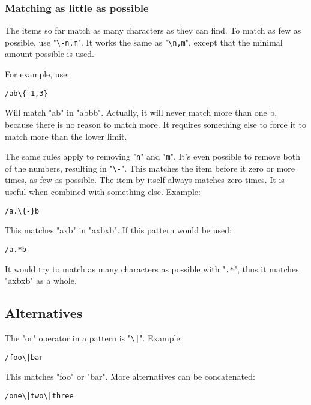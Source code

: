 \subsubsection{Matching as little as possible}
The items so far match as many characters as they can find.
To match as few as possible, use "\texttt{\textbackslash{}{-n,m}}".
It works the same as "\texttt{\textbackslash{}{n,m}}", except that the minimal amount possible is used.

For example, use:

\begin{Verbatim}[samepage=true]
 /ab\{-1,3}
\end{Verbatim}

Will match "ab" in "abbb".
Actually, it will never match more than one b, because there is no reason to match more.
It requires something else to force it to match more than the lower limit.

The same rules apply to removing "\texttt{n}" and "\texttt{m}".
It's even possible to remove both of the numbers, resulting in "\texttt{\textbackslash{}{-}}".
This matches the item before it zero or more times, as few as possible.
The item by itself always matches zero times.
It is useful when combined with something else.
Example:

\begin{Verbatim}[samepage=true]
 /a.\{-}b
\end{Verbatim}

This matches "axb" in "axbxb".
If this pattern would be used:

\begin{Verbatim}[samepage=true]
 /a.*b
\end{Verbatim}

It would try to match as many characters as possible with "\texttt{.*}", thus it matches "axbxb" as a whole.
\subsection{Alternatives}
The "or" operator in a pattern is "\texttt{\textbackslash{}|}".
Example:

\begin{Verbatim}[samepage=true]
 /foo\|bar
\end{Verbatim}

This matches "foo" or "bar".
More alternatives can be concatenated:

\begin{Verbatim}[samepage=true]
 /one\|two\|three
\end{Verbatim}

